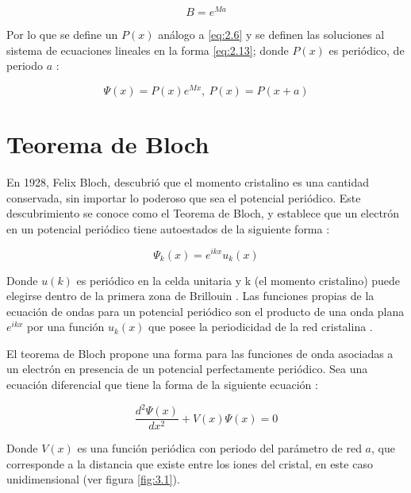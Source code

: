 \begin{equation}\label{eq:2.12}
    B=e^{Ma}
\end{equation}

Por lo que se define un $P(x)$ análogo a \ref{eq:2.6} y se definen las soluciones al sistema de ecuaciones lineales en la forma \ref{eq:2.13}; donde $P(x)$ es periódico, de periodo $a$ \cite{floquet}:

\begin{equation}\label{eq:2.13}
    \Psi(x)=P(x)e^{Mx}, \     P(x)=P(x+a)
\end{equation}



\section{Teorema de Bloch}\label{cap:3}

En 1928, Felix Bloch, descubrió que el momento cristalino es una cantidad conservada, sin importar lo poderoso que sea el potencial periódico. Este descubrimiento se conoce como el Teorema de Bloch, y establece que un electrón en un potencial periódico tiene autoestados de la siguiente forma \cite{oxford}:

\begin{equation}\label{eq:3.1}
\Psi_{k}(x)=e^{ikx}u_{k}(x)
\end{equation}

Donde $u(k)$ es periódico en la celda unitaria y k (el momento cristalino) puede elegirse dentro de la primera zona de Brillouin \cite{oxford}. Las funciones propias de la ecuación de ondas para un potencial periódico son el producto de una onda plana $e^{ikx}$ por una función $u_k(x)$ que posee la periodicidad de la red cristalina \cite{kittel}.

El teorema de Bloch propone una forma para las funciones de onda asociadas a un electrón en presencia de un potencial perfectamente periódico. Sea una ecuación diferencial que tiene la forma de la siguiente ecuación \cite{solidos}:

\begin{equation}\label{eq:3.2}
    \frac{d^2\Psi(x)}{dx^2}+V(x)\Psi(x)=0
\end{equation}

Donde $V(x)$ es una función periódica con periodo del parámetro de red $a$, que corresponde a la distancia que existe entre los iones del cristal, en este caso unidimensional (ver figura \ref{fig:3.1}).

